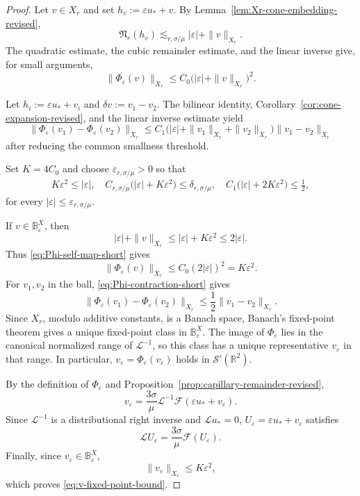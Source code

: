 \documentclass[12pt]{amsart}
\theoremstyle{remark}
\theoremstyle{definition}
\numberwithin{equation}{section}
\newcommand{\R}{\mathbb{R}}
\begin{document}
\begin{proof}
Let \(v\in X_r\) and set \(h_v:=\varepsilon u_*+v\).
By Lemma~\ref{lem:Xr-cone-embedding-revised},
\[
 \mathfrak N_r(h_v)\lesssim_{r,\sigma/\mu}|\varepsilon|+\|v\|_{X_r}.
\]
The quadratic estimate, the cubic remainder estimate, and the linear
inverse give, for small arguments,
\begin{equation}
\label{eq:Phi-self-map-short}
 \|\Phi_\varepsilon(v)\|_{X_r} \leq C_0 \bigl( |\varepsilon|+\|v\|_{X_r} \bigr)^2.
\end{equation}

Let \(h_i:=\varepsilon u_*+v_i\) and \(\delta v:=v_1-v_2\).
The bilinear identity, Corollary~\ref{cor:cone-expansion-revised}, and the
linear inverse estimate yield
\begin{equation}
\label{eq:Phi-contraction-short}
 \|\Phi_\varepsilon(v_1) -\Phi_\varepsilon(v_2)\|_{X_r}\leq C_1 \bigl( |\varepsilon| +\|v_1\|_{X_r} +\|v_2\|_{X_r} \bigr) \|v_1-v_2\|_{X_r}
\end{equation}
after reducing the common smallness threshold.

Set \(K=4C_0\) and choose \(\varepsilon_{r,\sigma/\mu}>0\) so that
\begin{equation*}
\begin{aligned}
 K\varepsilon^2\leq|\varepsilon|,\quad
 C_{r,\sigma/\mu} \bigl( |\varepsilon|+K\varepsilon^2 \bigr) \leq\delta_{r,\sigma/\mu},\quad
 C_1 \bigl( |\varepsilon|+2K\varepsilon^2 \bigr) \leq\frac12,
\end{aligned}
\end{equation*}
for every \(|\varepsilon|\leq\varepsilon_{r,\sigma/\mu}\).

If \(v\in\mathbb B_\varepsilon^X\), then
\[
 |\varepsilon|+\|v\|_{X_r} \leq |\varepsilon|+K\varepsilon^2 \leq 2|\varepsilon|.
\]
Thus \eqref{eq:Phi-self-map-short} gives
\[
 \|\Phi_\varepsilon(v)\|_{X_r} \leq C_0(2|\varepsilon|)^2 = K\varepsilon^2.
\]
For \(v_1,v_2\) in the ball, \eqref{eq:Phi-contraction-short} gives
\[
 \|\Phi_\varepsilon(v_1) -\Phi_\varepsilon(v_2)\|_{X_r} \leq \frac12\|v_1-v_2\|_{X_r}.
\]
Since \(X_r\), modulo additive constants, is a Banach space, Banach's
fixed-point theorem gives a unique fixed-point class in
\(\mathbb B_\varepsilon^X\). The image of \(\Phi_\varepsilon\) lies in
the canonical normalized range of \(\mathcal L^{-1}\), so this class has
a unique representative \(v_\varepsilon\) in that range. In particular,
\(v_\varepsilon=\Phi_\varepsilon(v_\varepsilon)\) holds in
\(\mathcal S'(\R^2)\).

By the definition of \(\Phi_\varepsilon\) and
Proposition~\ref{prop:capillary-remainder-revised},
\[
 v_\varepsilon = \frac{3\sigma}{\mu}\mathcal L^{-1} \mathscr F(\varepsilon u_*+v_\varepsilon).
\]
Since \(\mathcal L^{-1}\) is a distributional right inverse and
\(\mathcal Lu_*=0\), \(U_\varepsilon=\varepsilon u_*+v_\varepsilon\)
satisfies
\[
 \mathcal LU_\varepsilon = \frac{3\sigma}{\mu}\mathscr F(U_\varepsilon).
\]
Finally, since \(v_\varepsilon\in\mathbb B_\varepsilon^X\),
\[
 \|v_\varepsilon\|_{X_r}\leq K\varepsilon^2,
\]
which proves \eqref{eq:v-fixed-point-bound}.
\end{proof}
\end{document}
